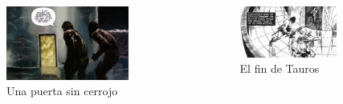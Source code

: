 \begin{frame}{}
\begin{columns}
    \begin{figure}[htb]
    \centering
        \includegraphics[width=0.8\textwidth]{img/res/11}
        \caption{Una puerta sin cerrojo}
    \end{figure}    
    \begin{figure}[htb]
    \centering
        \includegraphics[width=0.9\textwidth]{img/res/12}
        \caption{El fin de Tauros}
    \end{figure}    
\end{columns}
\end{frame}

